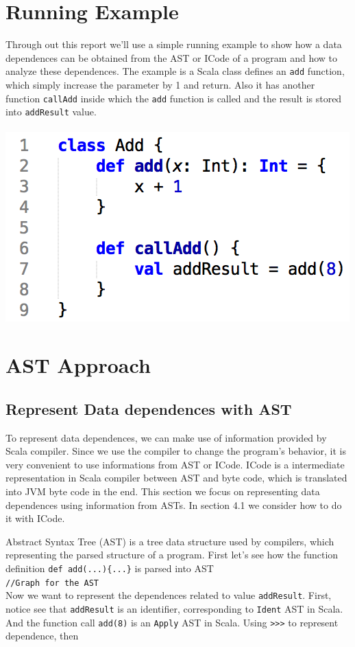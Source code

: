 \documentclass{article}[12pt]
\begin{document}
\section{Running Example}
Through out this report we'll use a simple running example to show how a data dependences can be obtained from the AST or ICode of a program and how to analyze these dependences. The example is a Scala class defines an \texttt{add} function, which simply increase the parameter by 1 and return. Also it has another function \texttt{callAdd} inside which the \texttt{add} function is called and the result is stored into \texttt{addResult} value. 
\\
\\
\includegraphics[scale=0.5]{figures/figure1}
\section{AST Approach} 

\subsection{Represent Data dependences with AST}
To represent data dependences, we can make use of information provided by Scala compiler. Since we use the compiler to change the program's behavior, it is very convenient to use informations from AST or ICode. ICode is a intermediate representation in Scala compiler between AST and byte code, which is translated into JVM byte code in the end. This section we focus on representing data dependences using information from ASTs. In section 4.1 we consider how to do it with ICode. 

Abstract Syntax Tree (AST) is a tree data structure used by compilers, which representing the parsed structure of a program. 
First let's see how the function definition \texttt{def add(...)\{...\}} is parsed into AST 
\\
\texttt{//Graph for the AST}
\\
Now we want to represent the dependences related to value \texttt{addResult}. 
First, notice see that \texttt{addResult} is an identifier, corresponding to \texttt{Ident} AST in Scala. And the function call \texttt{add(8)} is an \texttt{Apply} AST in Scala. Using \texttt{>>>} to represent dependence, then
\end{document}
